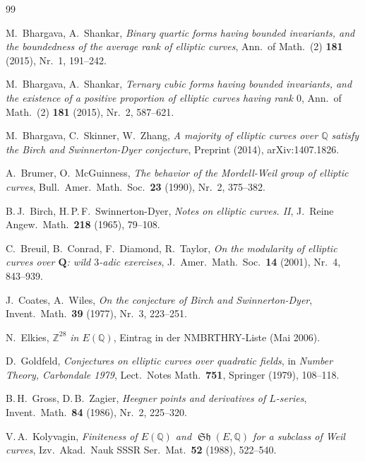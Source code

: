 \documentclass[12pt,a4paper]{amsart}
\theoremstyle{definition}
\theoremstyle{remark}
\DeclareMathOperator{\Sha}{\mathfrak{Sh}}
\begin{document}
\begin{thebibliography}{99}

M.\ Bhargava, A.\ Shankar,
\textit{Binary quartic forms having bounded invariants, and the boundedness of the
average rank of elliptic curves},
Ann.\ of Math.\ (2) \textbf{181} (2015), Nr.\ 1, 191--242.

M.\ Bhargava, A.\ Shankar,
\textit{Ternary cubic forms having bounded invariants, and the existence of a positive
proportion of elliptic curves having rank $0$},
Ann.\ of Math.\ (2) \textbf{181} (2015), Nr.\ 2, 587--621.

M.\ Bhargava, C.\ Skinner, W.\ Zhang,
\textit{A majority of elliptic curves over $\mathbb{Q}$ satisfy the Birch and
Swinnerton-Dyer conjecture},
Preprint (2014), arXiv:1407.1826.

A.\ Brumer, O.\ McGuinness,
\textit{The behavior of the Mordell-Weil group of elliptic curves},
Bull.\ Amer.\ Math.\ Soc.\ \textbf{23} (1990), Nr.\ 2, 375--382.

B.\,J.\ Birch, H.\,P.\,F.\ Swinnerton-Dyer,
\textit{Notes on elliptic curves. II},
J.\ Reine Angew.\ Math.\ \textbf{218} (1965), 79--108.

C.\ Breuil, B.\ Conrad, F.\ Diamond, R.\ Taylor,
\textit{On the modularity of elliptic curves over $\mathbf{Q}$: wild $3$-adic exercises},
J.\ Amer.\ Math.\ Soc.\ \textbf{14} (2001), Nr.\ 4, 843--939.

J.\ Coates, A.\ Wiles,
\textit{On the conjecture of Birch and Swinnerton-Dyer},
Invent.\ Math.\ \textbf{39} (1977), Nr.\ 3, 223--251.

N.\ Elkies,
\textit{$\mathbb{Z}^{28}$ in $E(\mathbb{Q})$},
Eintrag in der NMBRTHRY-Liste (Mai 2006).

D.\ Goldfeld,
\textit{Conjectures on elliptic curves over quadratic fields},
in \textit{Number Theory, Carbondale 1979}, Lect.\ Notes Math.\ \textbf{751},
Springer (1979), 108--118.

B.\,H.\ Gross, D.\,B.\ Zagier,
\textit{Heegner points and derivatives of $L$-series},
Invent.\ Math.\ \textbf{84} (1986), Nr.\ 2, 225--320.

V.\,A.\ Kolyvagin,
\textit{Finiteness of $E(\mathbb{Q})$ and $\Sha(E,\mathbb{Q})$ for a subclass of
Weil curves},
Izv.\ Akad.\ Nauk SSSR Ser.\ Mat.\ \textbf{52} (1988), 522--540.


\end{thebibliography}
\end{document}
